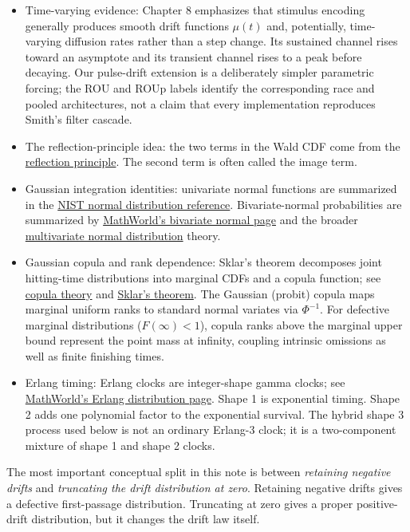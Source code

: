 \documentclass[12pt]{article}
\newcommand{\PhiN}{\Phi}
\begin{document}
\begin{itemize}
  \item Time-varying evidence: Chapter 8 emphasizes that stimulus encoding generally produces smooth drift functions $\mu(t)$ and, potentially, time-varying diffusion rates rather than a step change. Its sustained channel rises toward an asymptote and its transient channel rises to a peak before decaying. Our pulse-drift extension is a deliberately simpler parametric forcing; the ROU and ROUp labels identify the corresponding race and pooled architectures, not a claim that every implementation reproduces Smith's filter cascade.
  \item The reflection-principle idea: the two terms in the Wald CDF come from the \href{https://en.wikipedia.org/wiki/Reflection_principle_(Wiener_process)}{reflection principle}. The second term is often called the image term.
  \item Gaussian integration identities: univariate normal functions are summarized in the \href{https://itl.nist.gov/div898/handbook/eda/section3/eda3661.htm}{NIST normal distribution reference}. Bivariate-normal probabilities are summarized by \href{https://mathworld.wolfram.com/BivariateNormalDistribution.html}{MathWorld's bivariate normal page} and the broader \href{https://en.wikipedia.org/wiki/Multivariate_normal_distribution}{multivariate normal distribution} theory.
  \item Gaussian copula and rank dependence: Sklar's theorem decomposes joint hitting-time distributions into marginal CDFs and a copula function; see \href{https://en.wikipedia.org/wiki/Copula_(probability_theory)}{copula theory} and \href{https://en.wikipedia.org/wiki/Sklar%27s_theorem}{Sklar's theorem}. The Gaussian (probit) copula maps marginal uniform ranks to standard normal variates via $\PhiN^{-1}$. For defective marginal distributions ($F(\infty)<1$), copula ranks above the marginal upper bound represent the point mass at infinity, coupling intrinsic omissions as well as finite finishing times.
  \item Erlang timing: Erlang clocks are integer-shape gamma clocks; see \href{https://mathworld.wolfram.com/ErlangDistribution.html}{MathWorld's Erlang distribution page}. Shape 1 is exponential timing. Shape 2 adds one polynomial factor to the exponential survival. The hybrid shape 3 process used below is not an ordinary Erlang-3 clock; it is a two-component mixture of shape 1 and shape 2 clocks.
\end{itemize}

The most important conceptual split in this note is between \emph{retaining negative drifts} and \emph{truncating the drift distribution at zero}. Retaining negative drifts gives a defective first-passage distribution. Truncating at zero gives a proper positive-drift distribution, but it changes the drift law itself.
\end{document}
